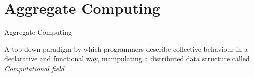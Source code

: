 \section{Aggregate Computing}
\begin{frame}{Aggregate Computing~\cite{DBLP:journals/jlap/ViroliBDACP19}}
  \begin{cardTiny}
    {
      \color{accent} A top-down paradigm by which programmers describe 
      collective behaviour in a declarative and functional way,
      manipulating a distributed data structure called \textit{Computational field} 
    }
  \end{cardTiny}
  \centering
\end{frame}